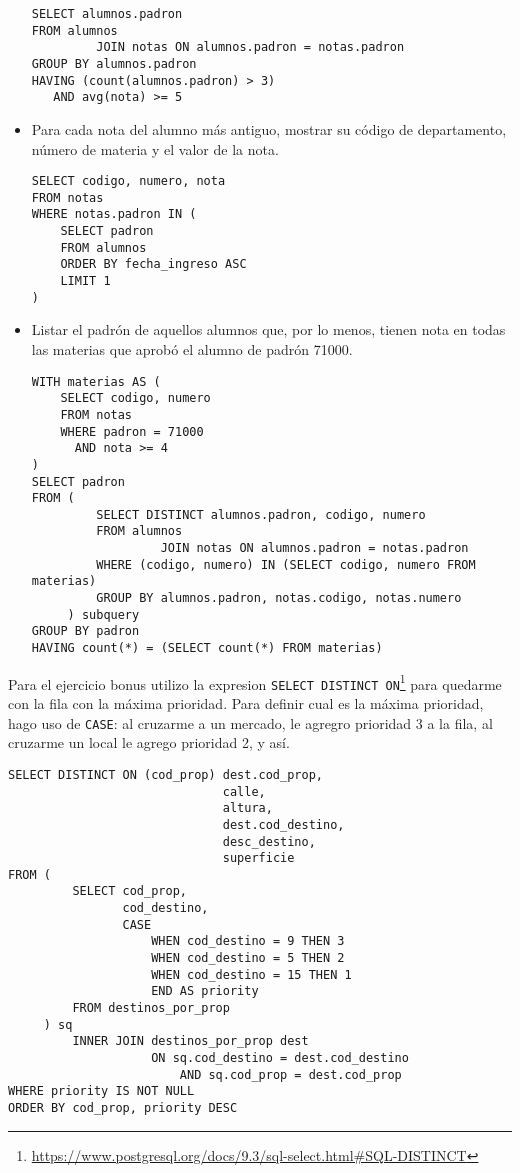 \documentclass[12pt, a4paper]{article}
\begin{document}
\begin{itemize}
\begin{lstlisting}[frame=single]
SELECT alumnos.padron
FROM alumnos
         JOIN notas ON alumnos.padron = notas.padron
GROUP BY alumnos.padron
HAVING (count(alumnos.padron) > 3)
   AND avg(nota) >= 5
\end{lstlisting}

\item Para cada nota del alumno más antiguo, mostrar su código de departamento, número de materia y el valor de la nota.

\begin{lstlisting}[frame=single]
SELECT codigo, numero, nota
FROM notas
WHERE notas.padron IN (
    SELECT padron
    FROM alumnos
    ORDER BY fecha_ingreso ASC
    LIMIT 1
)
\end{lstlisting}

\item Listar el padrón de aquellos alumnos que, por lo menos, tienen nota en todas las materias que aprobó el alumno de padrón 71000.

\begin{lstlisting}[frame=single]
WITH materias AS (
    SELECT codigo, numero
    FROM notas
    WHERE padron = 71000
      AND nota >= 4
)
SELECT padron
FROM (
         SELECT DISTINCT alumnos.padron, codigo, numero
         FROM alumnos
                  JOIN notas ON alumnos.padron = notas.padron
         WHERE (codigo, numero) IN (SELECT codigo, numero FROM materias)
         GROUP BY alumnos.padron, notas.codigo, notas.numero
     ) subquery
GROUP BY padron
HAVING count(*) = (SELECT count(*) FROM materias)
\end{lstlisting}

\end{itemize}

\newpage

Para el ejercicio bonus utilizo la expresion \texttt{SELECT DISTINCT ON}\footnote{\url{https://www.postgresql.org/docs/9.3/sql-select.html\#SQL-DISTINCT}} para quedarme con la fila con la máxima prioridad. Para definir cual es la máxima prioridad, hago uso de \texttt{CASE}: al cruzarme a un mercado, le agregro prioridad 3 a la fila, al cruzarme un local le agrego prioridad 2, y así.

\begin{lstlisting}[frame=single]
SELECT DISTINCT ON (cod_prop) dest.cod_prop,
                              calle,
                              altura,
                              dest.cod_destino,
                              desc_destino,
                              superficie
FROM (
         SELECT cod_prop,
                cod_destino,
                CASE
                    WHEN cod_destino = 9 THEN 3
                    WHEN cod_destino = 5 THEN 2
                    WHEN cod_destino = 15 THEN 1
                    END AS priority
         FROM destinos_por_prop
     ) sq
         INNER JOIN destinos_por_prop dest
                    ON sq.cod_destino = dest.cod_destino
                        AND sq.cod_prop = dest.cod_prop
WHERE priority IS NOT NULL
ORDER BY cod_prop, priority DESC
\end{lstlisting}
\end{document}
